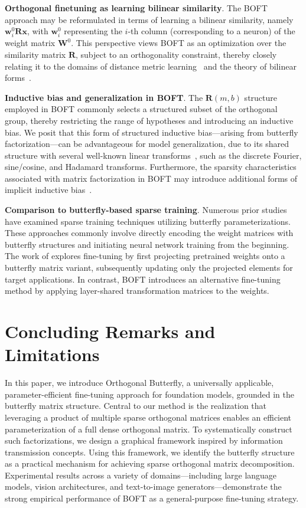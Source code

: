 \textbf{Orthogonal finetuning as learning bilinear similarity}. The BOFT approach may be reformulated in terms of learning a bilinear similarity, namely $\bm{w}^0_i\bm{R}\bm{x}$, with $\bm{w}^0_i$ representing the $i$-th column (corresponding to a neuron) of the weight matrix $\bm{W}^0$. This perspective views BOFT as an optimization over the similarity matrix $\bm{R}$, subject to an orthogonality constraint, thereby closely relating it to the domains of distance metric learning~\cite{xing2002distance} and the theory of bilinear forms~\cite{roman2005advanced}.

\textbf{Inductive bias and generalization in BOFT}. The $\bm{R}(m,b)$ structure employed in BOFT commonly selects a structured subset of the orthogonal group, thereby restricting the range of hypotheses and introducing an inductive bias. We posit that this form of structured inductive bias—arising from butterfly factorization—can be advantageous for model generalization, due to its shared structure with several well-known linear transforms~\cite{dao2019kaleidoscope}, such as the discrete Fourier, sine/cosine, and Hadamard transforms. Furthermore, the sparsity characteristics associated with matrix factorization in BOFT may introduce additional forms of implicit inductive bias~\cite{gunasekar2017implicit,li2018algorithmic,liu2019neural}.

\textbf{Comparison to butterfly-based sparse training}. Numerous prior studies~\cite{dao2019learning,dao2019kaleidoscope,chen2022pixelated,dao2022monarch} have examined sparse training techniques utilizing butterfly parameterizations. These approaches commonly involve directly encoding the weight matrices with butterfly structures and initiating neural network training from the beginning. The work of \cite{dao2022monarch} explores fine-tuning by first projecting pretrained weights onto a butterfly matrix variant, subsequently updating only the projected elements for target applications. In contrast, BOFT introduces an alternative fine-tuning method by applying layer-shared transformation matrices to the weights.



\section{Concluding Remarks and Limitations}

In this paper, we introduce Orthogonal Butterfly, a universally applicable, parameter-efficient fine-tuning approach for foundation models, grounded in the butterfly matrix structure. Central to our method is the realization that leveraging a product of multiple sparse orthogonal matrices enables an efficient parameterization of a full dense orthogonal matrix. To systematically construct such factorizations, we design a graphical framework inspired by information transmission concepts. Using this framework, we identify the butterfly structure as a practical mechanism for achieving sparse orthogonal matrix decomposition. Experimental results across a variety of domains—including large language models, vision architectures, and text-to-image generators—demonstrate the strong empirical performance of BOFT as a general-purpose fine-tuning strategy.

